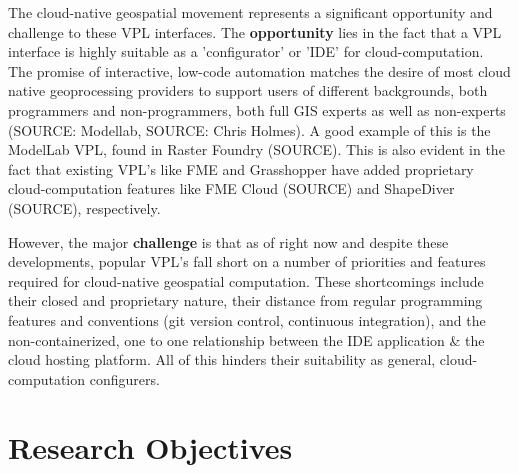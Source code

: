 The cloud-native geospatial movement represents a significant opportunity and challenge to these VPL interfaces. The \textbf{opportunity} lies in the fact that a VPL interface is highly suitable as a 'configurator' or 'IDE' for cloud-computation. The promise of interactive, low-code automation matches the desire of most cloud native geoprocessing providers to support users of different backgrounds, both programmers and non-programmers, both full GIS experts as well as non-experts (SOURCE: Modellab, SOURCE: Chris Holmes). A good example of this is the ModelLab VPL, found in Raster Foundry (SOURCE). This is also evident in the fact that existing VPL's like FME and Grasshopper have added proprietary cloud-computation features like FME Cloud (SOURCE) and ShapeDiver (SOURCE), respectively.

However, the major \textbf{challenge} is that as of right now and despite these developments, popular VPL's fall short on a number of priorities and features required for cloud-native geospatial computation. 
These shortcomings include their closed and proprietary nature, their distance from regular programming features and conventions (git version control, continuous integration), and the non-containerized, one to one relationship between the IDE application \& the cloud hosting platform. All of this hinders their suitability as general, cloud-computation configurers. 






\section{Research Objectives}

